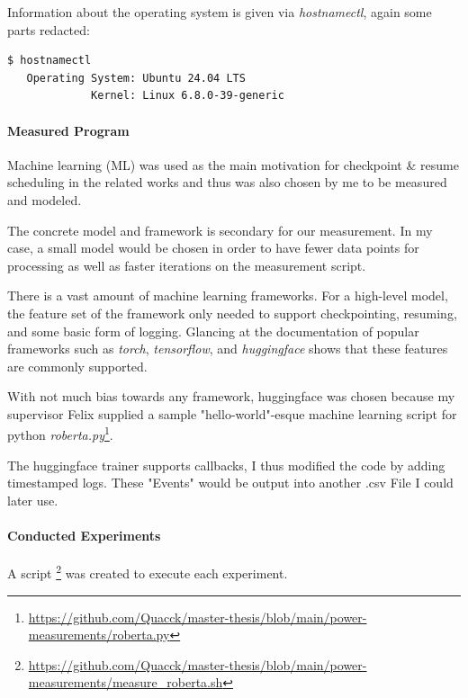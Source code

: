 Information about the operating system is given via \emph{hostnamectl}, again some parts redacted:

\begin{lstlisting}[language=bash, frame=single, numbers=none, caption={Used operating system information}, basicstyle=\ttfamily]
    $ hostnamectl 
   Operating System: Ubuntu 24.04 LTS                
             Kernel: Linux 6.8.0-39-generic
\end{lstlisting}

\paragraph{Measured Program}

Machine learning (ML) was used as the main motivation for checkpoint \& resume scheduling in the related works\cite {wiesner_lets_2021} and thus was also chosen by me to be measured and modeled. 

The concrete model and framework is secondary for our measurement. In my case, a small model would be chosen in order to have fewer data points for processing as well as faster iterations on the measurement script. 

There is a vast amount of machine learning frameworks. For a high-level model, the feature set of the framework only needed to support checkpointing, resuming, and some basic form of logging. 
Glancing at the documentation of popular frameworks such as \emph{torch}, \emph{tensorflow}, and \emph{huggingface} shows that these features are commonly supported. 

With not much bias towards any framework, huggingface was chosen because my supervisor Felix supplied a sample "hello-world"-esque machine learning script for python \emph{roberta.py}\footnote{\url{https://github.com/Quacck/master-thesis/blob/main/power-measurements/roberta.py}}.

The huggingface trainer supports callbacks, I thus modified the code by adding timestamped logs. These "Events" would be output into another .csv File I could later use.

\paragraph{Conducted Experiments}

A script \footnote{\url{https://github.com/Quacck/master-thesis/blob/main/power-measurements/measure_roberta.sh}} was created to execute each experiment. 

